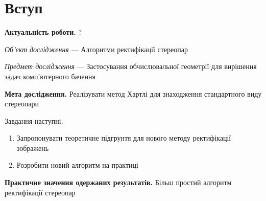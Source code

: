 \chapter*{Вступ}

\textbf{Актуальність роботи.}
?

\textit{Об’єкт дослідження} --- Алгоритми ректифікації стереопар

\textit{Предмет дослідження} --- Застосування обчислювальної геометрії
для вирішення задач комп'ютерного бачення

\textbf{Мета дослідження.}
Реалізувати метод Хартлі для знаходження стандартного виду стереопари 

Завдання наступні:
\begin{enumerate}
  \item
    Запропонувати теоретичне підгрунтя для нового методу ректифікації зображень
  \item
    Розробити новий алгоритм на практиці
\end{enumerate}

\textbf{Практичне значення одержаних результатів.}
Більш простий алгоритм ректифікації стереопар